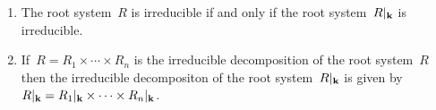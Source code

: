 \begin{proposition}
\begin{enumerate}
\begin{align*}
        \suchthat*
          \begin{tabular}{c}
            $R_1, \dotsc, R_n \subseteq R$ \\
            are root systems with \\
            $R = R_1 \times \dotsb \times R_n$
          \end{tabular}
        \right\}
        &\longto
        \left\{
          (R'_1, \dotsc, R'_n)
        \suchthat*
          \begin{tabular}{c}
            $R'_1, \dotsc, R'_n \subseteq \restrict{R}{\kf}$ \\
            are root systems with \\
            $\restrict{R}{\kf} = R'_1 \times \dotsb \times R'_n$
          \end{tabular}
        \right\} \,,
        \\
        (R_1, \dotsc, R_n)
        &\longmapsto
        \bigl( \restrict{R_1}{\kf}, \dotsc, \restrict{R_n}{\kf} \bigr) \,.
      \end{align*}
    \item
      The root system~$R$ is irreducible if and only if the root system~$\restrict{R}{\kf}$ is irreducible.
    \item
      If~$R = R_1 \times \dotsb \times R_n$ is the irreducible decomposition of the root system~$R$ then the irreducible decompositon of the root system~$\restrict{R}{\kf}$ is given by~$\restrict{R}{\kf} = \restrict{R_1}{\kf} \times \dotsb \times \restrict{R_n}{\kf}$.
  \end{enumerate}
\end{proposition}


